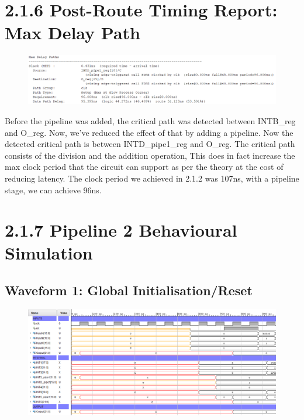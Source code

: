 \documentclass[11pt]{report}
\begin{document}
\section*{2.1.6 Post-Route Timing Report: Max Delay Path}
\begin{figure}[H]
    \includegraphics[width=\columnwidth]{Reports/Lab3/Assets/2.1.6_max-delay-path.png}
\end{figure}
Before the pipeline was added, the critical path was detected between INTB\_reg and O\_reg. Now, we've reduced the effect of that by adding a pipeline. Now the detected critical path is between INTD\_pipe1\_reg and O\_reg. The critical path consists of the division and the addition operation, This does in fact increase the max clock period that the circuit can support as per the theory at the cost of reducing latency. The clock period we achieved in 2.1.2 was 107ns, with a pipeline stage, we can achieve 96ns.

\section*{2.1.7 Pipeline 2 Behavioural Simulation}

\subsection*{Waveform 1: Global Initialisation/Reset}
\begin{figure}[H]
    \includegraphics[width=\columnwidth]{Reports/Lab3/Assets/2.1.7_waveform-initial-reset.png}
\end{figure}
\end{document}
